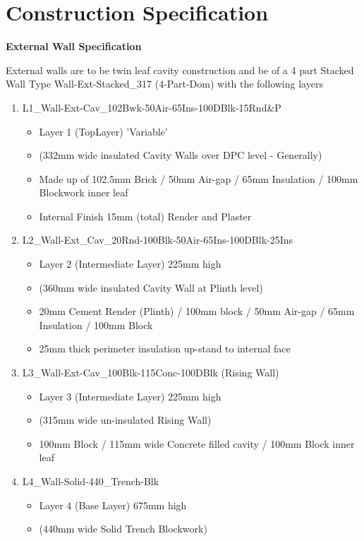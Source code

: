 \newpage

\section*{Construction Specification}


\textbf{External Wall Specification} 

External walls are to be twin leaf cavity construction and be of a 4 part Stacked Wall Type
Wall-Ext-Stacked\_317 (4-Part-Dom) with the following layers

\begin{enumerate}
	\item L1\_Wall-Ext-Cav\_102Bwk-50Air-65Ins-100DBlk-15Rnd\&P
	\begin{itemize}
		\item Layer 1 (TopLayer) 'Variable'
		\item (332mm wide insulated Cavity Walls over DPC level - Generally)
		\item Made up of 102.5mm Brick / 50mm Air-gap / 65mm Insulation / 100mm Blockwork inner leaf
		\item Internal Finish 15mm (total) Render and Plaster
	\end{itemize}
	
	\item L2\_Wall-Ext\_Cav\_20Rnd-100Blk-50Air-65Ins-100DBlk-25Ins
	\begin{itemize}
		\item Layer 2 (Intermediate Layer) 225mm high
		\item (360mm wide insulated Cavity Wall at Plinth level)
		\item 20mm Cement Render (Plinth) / 100mm block / 50mm Air-gap / 65mm Insulation / 100mm Block
		\item 25mm thick perimeter insulation up-stand to internal face
	\end{itemize}
	
	
	\item L3\_Wall-Ext-Cav\_100Blk-115Conc-100DBlk (Rising Wall)
	\begin{itemize}
		\item Layer 3 (Intermediate Layer) 225mm high
		\item (315mm wide un-insulated Rising Wall)
		\item 100mm Block / 115mm wide Concrete filled cavity / 100mm Block inner leaf
	\end{itemize}
	
	
	\item L4\_Wall-Solid-440\_Trench-Blk
	\begin{itemize}
		\item Layer 4 (Base Layer) 675mm high
		\item (440mm wide Solid Trench Blockwork)
	\end{itemize}
\end{enumerate}

